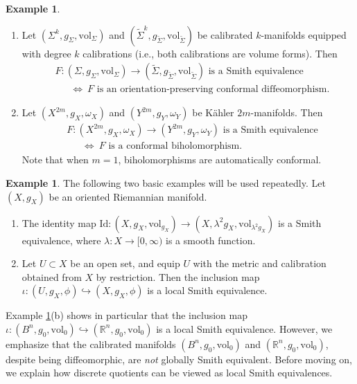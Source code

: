 \documentclass[11pt]{article}
\newcommand{\R}{\mathbb{R}}
\newcommand{\vol}{\mathrm{vol}}
\theoremstyle{definition}
\newtheorem{example}[thm]{Example}
\numberwithin{equation}{section}
\begin{document}
\begin{example} ${}$
\begin{enumerate}
\item Let $(\Sigma^k, g_\Sigma, \vol_{\Sigma})$ and $(\widetilde{\Sigma}^k, g_{\widetilde{\Sigma}}, \vol_{\widetilde{\Sigma}})$ be calibrated $k$-manifolds equipped with degree $k$ calibrations (i.e., both calibrations are volume forms).  Then
\begin{align*}
& F\colon (\Sigma, g_\Sigma, \vol_\Sigma) \to (\widetilde{\Sigma}, g_{\widetilde{\Sigma}}, \vol_{\widetilde{\Sigma}}) \text{ is a Smith equivalence} \\
& \ \ \ \ \ \ \ \iff \ F \text{ is an orientation-preserving conformal diffeomorphism.}
\end{align*}
\item Let $(X^{2m}, g_X, \omega_X)$ and $(Y^{2m}, g_Y, \omega_Y)$ be K\"{a}hler $2m$-manifolds.  Then
\begin{align*}
& F\colon (X^{2m}, g_X, \omega_X) \to (Y^{2m}, g_Y, \omega_Y) \text{ is a Smith equivalence} \\
& \ \ \ \ \ \ \ \iff \ F \text{ is a conformal biholomorphism.}
\end{align*}
Note that when $m = 1$, biholomorphisms are automatically conformal.
\end{enumerate}
\end{example}


\begin{example} \label{example:Inclusion} The following two basic examples will be used repeatedly.  Let $(X, g_X)$ be an oriented Riemannian manifold.
\begin{enumerate}
\item The identity map $\mathrm{Id} \colon (X, g_X, \vol_{g_X}) \to (X, \lambda^2 g_X, \vol_{\lambda^2 g_X})$ is a Smith equivalence, where $\lambda \colon X \to [0,\infty)$ is a smooth function. 
\item Let $U \subset X$ be an open set, and equip $U$ with the metric and calibration obtained from $X$ by restriction.  Then the inclusion map $\iota \colon (U, g_X, \phi) \hookrightarrow (X, g_X, \phi)$ is a local Smith equivalence.
\end{enumerate}
\end{example}

Example \ref{example:Inclusion}(b) shows in particular that the inclusion map $\iota \colon (B^n, g_0, \vol_0) \hookrightarrow (\R^n, g_0, \vol_0)$ is a local Smith equivalence.  However, we emphasize that the calibrated manifolds $(B^n, g_0, \vol_0)$ and $(\R^n, g_0, \vol_0)$, despite being diffeomorphic, are \emph{not} globally Smith equivalent.  Before moving on, we explain how discrete quotients can be viewed as local Smith equivalences.
\end{document}
